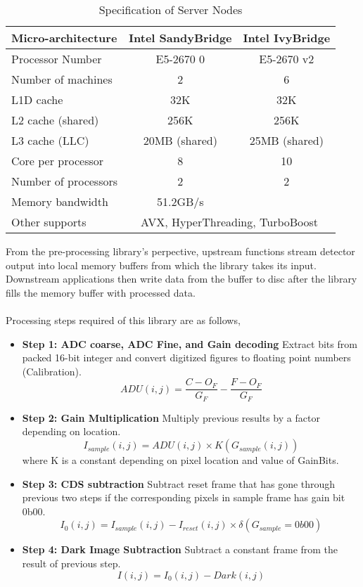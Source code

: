 \documentclass[journal]{IEEEtran}
\begin{document}
\begin{table}[h]
\centering
\label{servers}
\begin{tabular}{l | c c}
\hline
Micro-architecture & Intel SandyBridge & Intel IvyBridge \\
\hline
Processor Number& 	E5-2670 0	& E5-2670 v2 \\
Number of machines&	2		& 6	\\
L1D cache	&	32K		& 32K \\
L2 cache (shared)&	256K		& 256K \\
L3 cache (LLC)	&	20MB (shared)	& 25MB (shared) \\
Core per processor  &	8		& 10	\\
Number of processors  &	2		& 2	\\
Memory bandwidth    &51.2GB/s       & \\
\hline
Other supports  & 
\multicolumn{2}{|c}{AVX, HyperThreading, TurboBoost}  	\\
\hline
\end{tabular}
\caption{Specification of Server Nodes}
\end{table}


From the pre-processing library's perpective, upstream functions stream detector output into local memory buffers from which the library takes its input. Downstream applications then write data from the buffer to disc after the library fills the memory buffer with processed data. \\ \\
Processing steps required of this library are as follows,
\begin{itemize}
 \item \textbf{Step 1: ADC coarse, ADC Fine, and Gain decoding} Extract bits from packed 16-bit integer and convert digitized figures to floating point numbers (Calibration).
	\begin{equation}
		ADU(i,j) = \frac{C - O_F}{G_F} - \frac{F - O_F}{G_F}
	\end{equation}
 \item \textbf{Step 2: Gain Multiplication} Multiply previous results by a factor depending on location.
	\begin{equation}
		I_{sample}(i,j) = ADU(i,j) \times K(G_{sample}(i,j))
	\end{equation}
where K is a constant depending on pixel location and value of GainBits.	
 \item \textbf{Step 3: CDS subtraction} Subtract reset frame that has gone through previous two steps if the corresponding pixels in sample frame has gain bit 0b00.
	\begin{equation}	
		I_0(i,j) = I_{sample}(i,j) - I_{reset}(i,j) \times \delta(G_{sample}=0b00)
	\end{equation}
 \item \textbf{Step 4: Dark Image Subtraction} Subtract a constant frame from the result of previous step.
	\begin{equation}
		I(i,j) = I_0(i,j) - Dark(i,j)
	\end{equation}
\end{itemize}
\end{document}
